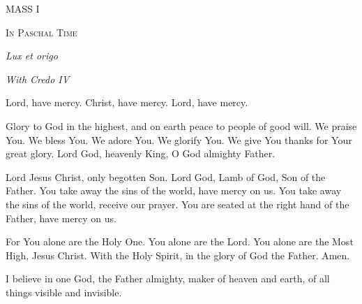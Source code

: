 \documentclass[11pt]{article} %
\begin{document}
\begin{center}\begin{huge}\textsc{MASS I}\end{huge}\end{center}
\begin{center}\begin{huge}\textsc{In Paschal Time}\end{huge}\end{center}
\begin{center}\begin{huge}\emph{Lux et origo}\end{huge}\end{center}
\begin{center}\begin{large}\emph{With Credo IV}\end{large}\end{center}


\def\greinitialformat#1{%
{\fontsize{34}{34}\selectfont #1}%
}

\vskip30pt

Lord, have mercy. Christ, have mercy. Lord, have mercy.

\vskip20pt

Glory to God in the highest, and on earth peace to people of good will.  We praise You.  We bless You.  We adore You.  We glorify You.  We give You thanks for Your great glory.  Lord God, heavenly King, O God almighty Father.

Lord Jesus Christ, only begotten Son.  Lord God, Lamb of God, Son of the Father.  You take away the sins of the world, have mercy on us.  You take away the sins of the world, receive our prayer.  You are seated at the right hand of the Father, have mercy on us.

For You alone are the Holy One.  You alone are the Lord.  You alone are the Most High, Jesus Christ.  With the Holy Spirit, in the glory of God the Father.  Amen.

\vskip20pt

I believe in one God, the Father almighty, maker of heaven and earth, of all things visible and invisible.
\end{document}
